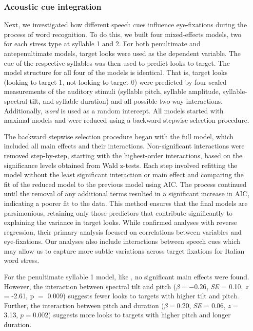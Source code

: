 \subsubsection{Acoustic cue integration}

Next, we investigated how different speech cues influence eye-fixations during the process of word recognition. To do this, we built four mixed-effects models, two for each stress type at syllable 1 and 2. For both penultimate and antepenultimate models, target looks were used as the dependent variable. The cue of the respective syllables was then used to predict looks to target. The model structure for all four of the models is identical. That is, target looks (looking to target-1, not looking to target-0) were predicted by four scaled measurements of the auditory stimuli (syllable pitch, syllable amplitude, syllable-spectral tilt, and syllable-duration) and all possible two-way interactions. Additionally, \textit{word} is used as a random intercept. All models started with maximal models and were reduced using a backward stepwise selection procedure. 

The backward stepwise selection procedure began with the full model, which included all main effects and their interactions. Non-significant interactions were removed step-by-step, starting with the highest-order interactions, based on the significance levels obtained from Wald z-tests. Each step involved refitting the model without the least significant interaction or main effect and comparing the fit of the reduced model to the previous model using AIC. The process continued until the removal of any additional terms resulted in a significant increase in AIC, indicating a poorer fit to the data. This method ensures that the final models are parsimonious, retaining only those predictors that contribute significantly to explaining the variance in target looks. While \cite{Sulpizio_McQueen_2012} confirmed analyses with reverse regression, their primary analysis focused on correlations between variables and eye-fixations. Our analyses also include interactions between speech cues which may allow us to capture more subtle variations across target fixations for Italian word stress.

For the penultimate syllable 1 model, like \cite{Sulpizio_McQueen_2012}, no significant main effects were found. However, the interaction between spectral tilt and pitch ($\beta= -0.26$, \textit{SE} = 0.10, \textit{z} = -2.61, p $=$ 0.009) suggests fewer looks to targets with higher tilt and pitch. Further, the interaction between pitch and duration ($\beta= 0.20$, \textit{SE} = 0.06, \textit{z} = 3.13, $p = 0.002$) suggests more looks to targets with higher pitch and longer duration.

